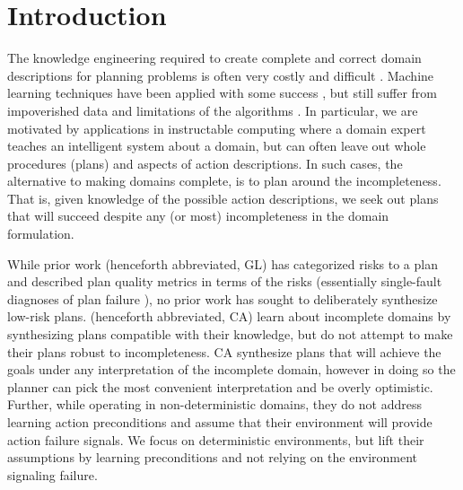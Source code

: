 \documentclass{article}
\def\citep#1{\cite{#1}}
\def\citet#1{\citeA{#1}}
\begin{document}
\section{Introduction}
%
%
%
%
The knowledge engineering required to create complete and correct domain descriptions for planning problems is often very costly and difficult \citep{modellite,arms}.  Machine learning techniques have been applied with some success \citep{arms}, but still suffer from impoverished data and limitations of the algorithms \citep{modellite}.   In particular, we are motivated by applications in instructable computing \citep{mable} where a domain expert teaches an intelligent system about a domain, but can often leave out whole procedures (plans) and aspects of action descriptions.   In such cases, the alternative to making domains complete, is to plan around the incompleteness.  That is, given knowledge of the possible action descriptions, we seek out plans that will succeed despite any (or most) incompleteness in the domain formulation. 
%
%

While prior work \citep{Garland02} (henceforth abbreviated, GL) has categorized risks to a plan and described plan quality metrics in terms of the risks (essentially single-fault diagnoses of plan failure \citep{dekleer,reiter}), no prior work has sought to deliberately synthesize low-risk plans.  
\citet{DBLP:conf/aips/ChangA06} (henceforth abbreviated, CA) learn about incomplete domains by synthesizing plans compatible with their knowledge, but do not attempt to make their plans robust to incompleteness. CA synthesize plans that will achieve the goals under any interpretation of the incomplete domain, however in doing so the planner can pick the most convenient interpretation and be overly optimistic.   Further, while operating in non-deterministic domains, they do not address learning action preconditions and assume that their environment will provide action failure signals.  We focus on deterministic environments, but lift their assumptions by learning preconditions and not relying on the environment signaling failure.  
\end{document}
